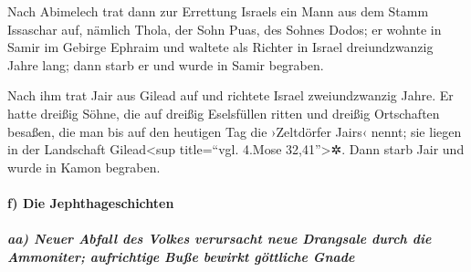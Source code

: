 Nach Abimelech trat dann zur Errettung Israels ein Mann
aus dem Stamm Issaschar auf, nämlich Thola, der Sohn Puas, des Sohnes
Dodos; er wohnte in Samir im Gebirge Ephraim und waltete
als Richter in Israel dreiundzwanzig Jahre lang; dann starb er und wurde
in Samir begraben.

Nach ihm trat Jair aus Gilead auf und richtete Israel
zweiundzwanzig Jahre. Er hatte dreißig Söhne, die auf
dreißig Eselsfüllen ritten und dreißig Ortschaften besaßen, die man bis
auf den heutigen Tag die ›Zeltdörfer Jairs‹ nennt; sie liegen in der
Landschaft Gilead\textless sup title=``vgl. 4.Mose 32,41''\textgreater✲.
Dann starb Jair und wurde in Kamon begraben.

\hypertarget{f-die-jephthageschichten}{%
\paragraph{f) Die Jephthageschichten}\label{f-die-jephthageschichten}}

\hypertarget{aa-neuer-abfall-des-volkes-verursacht-neue-drangsale-durch-die-ammoniter-aufrichtige-buuxdfe-bewirkt-guxf6ttliche-gnade}{%
\subparagraph{aa) Neuer Abfall des Volkes verursacht neue Drangsale
durch die Ammoniter; aufrichtige Buße bewirkt göttliche
Gnade}\label{aa-neuer-abfall-des-volkes-verursacht-neue-drangsale-durch-die-ammoniter-aufrichtige-buuxdfe-bewirkt-guxf6ttliche-gnade}}

